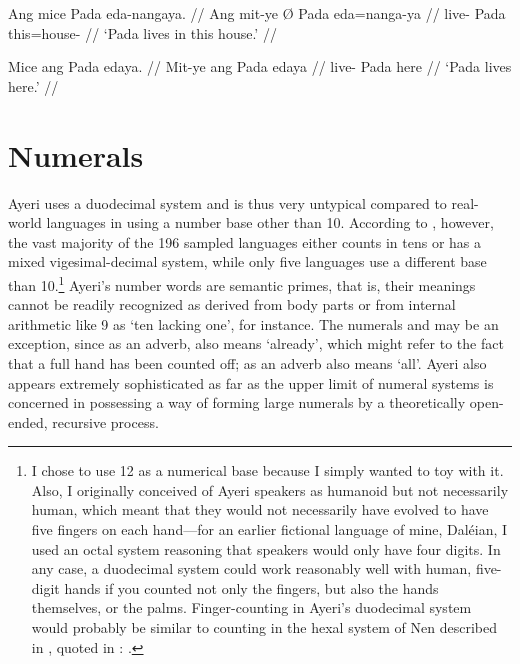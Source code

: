 \a\label{ex:edanp}\begingl
	\gla Ang mice {} Pada eda-nangaya. //
	\glb Ang mit-ye Ø Pada eda=nanga-ya //
	\glc \AgtT{} live-\TsgF{} \Top{} Pada this=house-\Loc{} //
	\glft `Pada lives in this house.' //
\endgl

\a\label{ex:edanyapro}\begingl
	\gla Mice ang Pada edaya. //
	\glb Mit-ye ang Pada edaya //
	\glc live-\TsgF{} \Aarg{} Pada here //
	\glft `Pada lives here.' //
\endgl

\xe



\section{Numerals}

Ayeri uses a duodecimal system and is thus very untypical compared to 
real-world languages in using a number base other than 10. According to 
\citet{wals131}, however, the vast majority of the 196 sampled languages either 
counts in tens or has a mixed vigesimal-decimal system, while only five 
languages use a different base than 10.\footnote{I chose to use 12 as a 
numerical base because I simply wanted to toy with it. Also, I originally 
conceived of Ayeri speakers as humanoid but not necessarily human, which meant 
that they would not necessarily have evolved to have five fingers on each 
hand---for an earlier fictional language of mine, Daléian, I used an octal 
system reasoning that speakers would only have four digits. In any case, a 
duodecimal system could work reasonably well with human, five-digit hands if you 
counted not only the fingers, but also the hands themselves, or the palms. 
Finger-counting in Ayeri's duodecimal system would probably be similar to 
counting in the hexal system of Nen described in \citet{evans2009}, quoted in 
\citeauthor{dixon2012}: .} Ayeri's number words are semantic primes, that is, their meanings 
cannot be readily recognized as derived from body parts \citep[74]{dixon2012} or 
from internal arithmetic like 9 as `ten lacking one', for instance. The 
numerals  and  may be an exception, 
since as an adverb,  also means `already', which might refer to 
the fact that a full hand has been counted off;  as an adverb 
also means `all'. Ayeri also appears extremely sophisticated as far as the upper 
limit of numeral systems is concerned in possessing a way of forming large 
numerals by a theoretically open-ended, recursive process.

